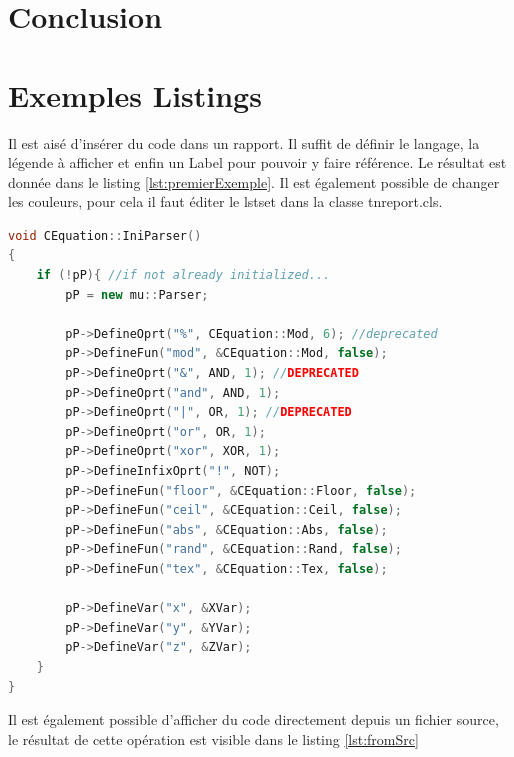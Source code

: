 \documentclass{tnreport}
\begin{document}
\chapter{Conclusion}

\cleardoublepage

\chapter{Exemples Listings}

Il est aisé d'insérer du code dans un rapport. Il suffit de définir le langage, la légende à afficher et enfin un Label pour pouvoir y faire référence. Le résultat est donnée dans le listing \ref{lst:premierExemple}. Il est également possible de changer les couleurs, pour cela il faut éditer le lstset dans la classe tnreport.cls.

\begin{lstlisting}[language=c++, caption={Premier Exemple}, label={lst:premierExemple}]
void CEquation::IniParser()
{
	if (!pP){ //if not already initialized...
		pP = new mu::Parser;

		pP->DefineOprt("%", CEquation::Mod, 6); //deprecated
		pP->DefineFun("mod", &CEquation::Mod, false);
		pP->DefineOprt("&", AND, 1); //DEPRECATED
		pP->DefineOprt("and", AND, 1);
		pP->DefineOprt("|", OR, 1); //DEPRECATED
		pP->DefineOprt("or", OR, 1);
		pP->DefineOprt("xor", XOR, 1);
		pP->DefineInfixOprt("!", NOT);
		pP->DefineFun("floor", &CEquation::Floor, false);
		pP->DefineFun("ceil", &CEquation::Ceil, false);
		pP->DefineFun("abs", &CEquation::Abs, false);
		pP->DefineFun("rand", &CEquation::Rand, false);
		pP->DefineFun("tex", &CEquation::Tex, false);
	
		pP->DefineVar("x", &XVar);
		pP->DefineVar("y", &YVar);
		pP->DefineVar("z", &ZVar);
	}
}
\end{lstlisting}
\clearpage
Il est également possible d'afficher du code directement depuis un fichier source, le résultat de cette opération est visible dans le listing \ref{lst:fromSrc}

\end{document}
